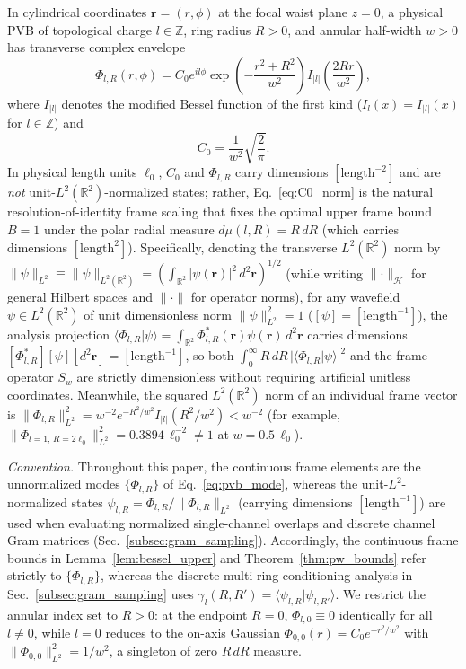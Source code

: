 \documentclass[aps,pra,onecolumn,notitlepage,11pt,tightenlines,nofootinbib,floatfix,longbibliography]{revtex4-2}
\theoremstyle{remark}
\newcommand{\braket}[2]{\langle #1 | #2 \rangle}
\newcommand{\norm}[1]{\lVert #1 \rVert}
\newcommand{\abs}[1]{\lvert #1 \rvert}
\begin{document}
In cylindrical coordinates $\mathbf{r} = (r,\phi)$ at the focal waist plane $z = 0$, a physical PVB of topological charge $l \in \mathbb{Z}$, ring radius $R > 0$, and annular half-width $w > 0$ has transverse complex envelope~\cite{Ostrovsky2013,Vaity2015}
\begin{equation}
\Phi_{l,R}(r,\phi) = C_0 e^{il\phi} \exp\!\left(-\frac{r^2 + R^2}{w^2}\right) I_{\abs{l}}\!\left(\frac{2Rr}{w^2}\right),
\label{eq:pvb_mode}
\end{equation}
where $I_{\abs{l}}$ denotes the modified Bessel function of the first kind ($I_l(x) = I_{\abs{l}}(x)$ for $l \in \mathbb{Z}$) and
\begin{equation}
C_0 = \frac{1}{w^2}\sqrt{\frac{2}{\pi}}.
\label{eq:C0_norm}
\end{equation}
In physical length units $\ell_0$, $C_0$ and $\Phi_{l,R}$ carry dimensions $[\mathrm{length}^{-2}]$ and are \emph{not} unit-$L^2(\mathbb{R}^2)$-normalized states; rather, Eq.~\eqref{eq:C0_norm} is the natural resolution-of-identity frame scaling that fixes the optimal upper frame bound $B = 1$ under the polar radial measure $d\mu(l,R) = R\,dR$ (which carries dimensions $[\mathrm{length}^2]$). Specifically, denoting the transverse $L^2(\mathbb{R}^2)$ norm by $\norm{\psi}_{L^2} \equiv \norm{\psi}_{L^2(\mathbb{R}^2)} = (\int_{\mathbb{R}^2}\abs{\psi(\mathbf{r})}^2\,d^2\mathbf{r})^{1/2}$ (while writing $\norm{\cdot}_{\mathcal{H}}$ for general Hilbert spaces and $\norm{\cdot}$ for operator norms), for any wavefield $\psi \in L^2(\mathbb{R}^2)$ of unit dimensionless norm $\norm{\psi}_{L^2}^2 = 1$ ($[\psi] = [\mathrm{length}^{-1}]$), the analysis projection $\braket{\Phi_{l,R}}{\psi} = \int_{\mathbb{R}^2}\Phi_{l,R}^*(\mathbf{r})\psi(\mathbf{r})\,d^2\mathbf{r}$ carries dimensions $[\Phi_{l,R}^*][\psi][d^2\mathbf{r}] = [\mathrm{length}^{-1}]$, so both $\int_0^\infty R\,dR\,\abs{\braket{\Phi_{l,R}}{\psi}}^2$ and the frame operator $S_w$ are strictly dimensionless without requiring artificial unitless coordinates. Meanwhile, the squared $L^2(\mathbb{R}^2)$ norm of an individual frame vector is $\norm{\Phi_{l,R}}_{L^2}^2 = w^{-2} e^{-R^2/w^2} I_{\abs{l}}(R^2/w^2) < w^{-2}$ (for example, $\norm{\Phi_{l=1,\,R=2\ell_0}}_{L^2}^2 = 0.3894\,\ell_0^{-2} \neq 1$ at $w = 0.5\,\ell_0$).

\emph{Convention.} Throughout this paper, the continuous frame elements are the unnormalized modes $\{\Phi_{l,R}\}$ of Eq.~\eqref{eq:pvb_mode}, whereas the unit-$L^2$-normalized states $\psi_{l,R} = \Phi_{l,R}/\norm{\Phi_{l,R}}_{L^2}$ (carrying dimensions $[\mathrm{length}^{-1}]$) are used when evaluating normalized single-channel overlaps and discrete channel Gram matrices (Sec.~\ref{subsec:gram_sampling}). Accordingly, the continuous frame bounds in Lemma~\ref{lem:bessel_upper} and Theorem~\ref{thm:pw_bounds} refer strictly to $\{\Phi_{l,R}\}$, whereas the discrete multi-ring conditioning analysis in Sec.~\ref{subsec:gram_sampling} uses $\gamma_l(R,R') = \braket{\psi_{l,R}}{\psi_{l,R'}}$. We restrict the annular index set to $R > 0$: at the endpoint $R = 0$, $\Phi_{l,0} \equiv 0$ identically for all $l \neq 0$, while $l = 0$ reduces to the on-axis Gaussian $\Phi_{0,0}(r) = C_0 e^{-r^2/w^2}$ with $\norm{\Phi_{0,0}}_{L^2}^2 = 1/w^2$, a singleton of zero $R\,dR$ measure.
\end{document}
